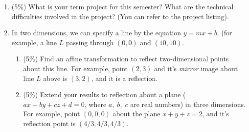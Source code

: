 \documentclass[fleqn]{article}
\begin{document}
\begin{enumerate}
\begin{minipage}[c]{\linewidth}
{         }
         \medskip
      \end{minipage}
   \newpage
   \item (5\%) What is your term project for this semester? What are the technical difficulties involved in the project? (You can refer to the project listing).
   \item In two dimensions, we can specify a line by the equation $y = m x + b$. (for example, a line $L$ passing through $(0,0)$ and $(10,10)$.
      \begin{enumerate}
         \item (5\%) Find an affine transformation to reflect two-dimensional points about this line. For example, point $(2,3)$ and it's \emph{mirror} image about line $L$ above is $(3,2)$, and it is a reflection. 
         \item (5\%) Extend your results to reflection about a plane ($ax + by + cz + d =0$, where $a,\;b,\;c$ are real numbers) in three dimensions. For example, point $(0,0,0)$ about the plane $x + y + z = 2$, and it's reflection point is $(4/3, 4/3, 4/3)$.
      \end{enumerate}
\end{enumerate}
\end{document}
